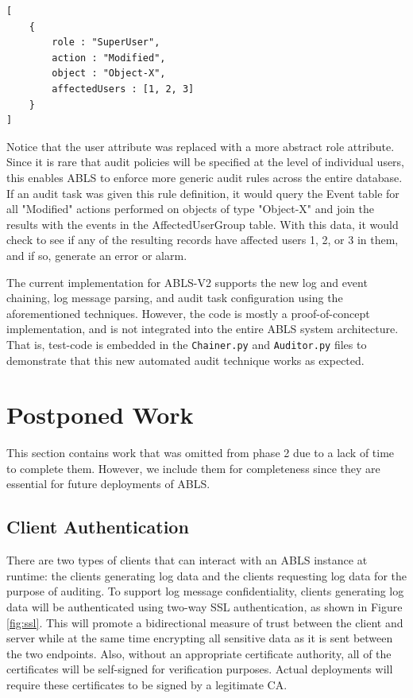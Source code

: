 \documentclass{sig-alternate}
\begin{document}
\begin{lstlisting}
[
    {
        role : "SuperUser",
        action : "Modified",
        object : "Object-X",
        affectedUsers : [1, 2, 3]
    }
]
\end{lstlisting}

Notice that the user attribute was replaced with a more abstract role attribute. Since it is rare that audit policies will
be specified at the level of individual users, this enables ABLS to enforce more generic audit rules across the 
entire database. If an audit task was given this rule definition, it would query the Event table for all
"Modified" actions performed on objects of type "Object-X" and join the results with the events in the AffectedUserGroup
table. With this data, it would check to see if any of the resulting records have affected users 1, 2, or 3 in them, and if
so, generate an error or alarm. 

The current implementation for ABLS-V2 supports the new log and event chaining, log message parsing, and 
audit task configuration using the aforementioned techniques. However, the code is mostly a proof-of-concept 
implementation, and is not integrated into the entire ABLS system architecture. That is, test-code is embedded
in the {\tt Chainer.py} and {\tt Auditor.py} files to demonstrate that this new automated audit technique works as 
expected.

\section{Postponed Work}
This section contains work that was omitted from phase 2 due to a lack of time to complete them. However, we include them for completeness since they are essential for future deployments of ABLS.

\subsection{Client Authentication}
\label{sec:auth}
There are two types of clients that can interact with an ABLS instance at runtime: the clients generating log data and the
clients requesting log data for the purpose of auditing. To support log message confidentiality, clients generating 
log data will be authenticated using two-way SSL authentication, as shown in Figure \ref{fig:ssl}. This will 
promote a bidirectional measure of trust between the client and server while at the same time encrypting 
all sensitive data as it is sent between the two endpoints. Also, without an appropriate certificate authority, all
of the certificates will be self-signed for verification purposes. Actual deployments will require these certificates
to be signed by a legitimate CA.
\end{document}
